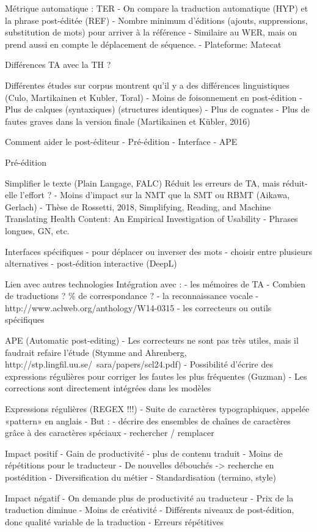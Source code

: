 Métrique automatique : TER
- On compare la traduction automatique (HYP) et la phrase post-éditée (REF)
- Nombre minimum d’éditions (ajouts, suppressions, substitution de mots) pour arriver à la référence
- Similaire au WER, mais on prend aussi en compte le déplacement de séquence.
- Plateforme: Matecat

Différences TA avec la TH ?

Différentes études sur corpus montrent qu’il y a des différences linguistiques (Culo, Martikainen et Kubler, Toral)
    - Moins de foisonnement en post-édition
    - Plus de calques (syntaxiques) (structures identiques)
    - Plus de cognates
    - Plus de fautes graves dans la version finale (Martikainen et Kübler, 2016)


Comment aider le post-éditeur
- Pré-édition
- Interface
- APE

Pré-édition

Simplifier le texte (Plain Langage, FALC)
Réduit les erreurs de TA, mais réduit-elle l’effort ?
    - Moins d’impact sur la NMT que la SMT ou RBMT (Aikawa, Gerlach) - Thèse de Rossetti, 2018, Simplifying, Reading, and Machine Translating Health Content: An Empirical Investigation of Usability
    - Phrases longues, GN, etc.

Interfaces spécifiques
- pour déplacer ou inverser des mots
- choisir entre plusieurs alternatives
- post-édition interactive (DeepL)

Lien avec autres technologies
Intégration avec :
    - les mémoires de TA
        - Combien de traductions ? \% de correspondance ?
    - la reconnaissance vocale
        - http://www.aclweb.org/anthology/W14-0315
    - les correcteurs ou outils spécifiques

APE (Automatic post-editing)
- Les correcteurs ne sont pas très utiles, mais il faudrait refaire l’étude (Stymme and Ahrenberg, http://stp.lingfil.uu.se/~sara/papers/scl24.pdf)
- Possibilité d’écrire des expressions régulières pour corriger les fautes les plus fréquentes (Guzman)
- Les corrections sont directement intégrées dans les modèles

Expressions régulières (REGEX !!!)
- Suite de caractères typographiques, appelée «pattern» en anglais
- But :
    - décrire des ensembles de chaînes de caractères grâce à des caractères spéciaux
    - rechercher / remplacer

Impact positif
- Gain de productivité
    - plus de contenu traduit
- Moins de répétitions pour le traducteur
- De nouvelles débouchés -> recherche en postédition
- Diversification du métier
- Standardisation (termino, style)

Impact négatif
- On demande plus de productivité au traducteur
- Prix de la traduction diminue
- Moins de créativité
- Différents niveaux de post-édition, donc qualité variable de la traduction
- Erreurs répétitives
